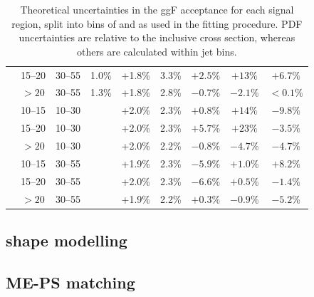\begin{table}
\begin{tabular}{ccc|cccccc}
		& 15--20 & 30--55 & 1.0\% & +1.8\% & 3.3\% & $+2.5\%$ & $+13\%$  & $+6.7\%$  \\
		&  $>20$ & 30--55 & 1.3\% & +1.8\% & 2.8\% & $-0.7\%$ & $-2.1\%$ & $<0.1\%$ \\
		\hline
		\multirow{6}{*}{\twojet}
	    & 10--15 & 10--30 &       & +2.0\% & 2.3\% & $+0.8\%$ & $+14\%$  & $-9.8\%$ \\
		& 15--20 & 10--30 &       & +2.0\% & 2.3\% & $+5.7\%$ & $+23\%$  & $-3.5\%$  \\
		&  $>20$ & 10--30 &       & +2.0\% & 2.2\% & $-0.8\%$ & $-4.7\%$ & $-4.7\%$ \\
		& 10--15 & 30--55 &       & +1.9\% & 2.3\% & $-5.9\%$ & $+1.0\%$ & $+8.2\%$ \\
		& 15--20 & 30--55 &       & +2.0\% & 2.3\% & $-6.6\%$ & $+0.5\%$ & $-1.4\%$ \\
		&  $>20$ & 30--55 &       & +1.9\% & 2.2\% & $+0.3\%$ & $-0.9\%$ & $-5.2\%$ \\
	\end{tabular}
	\caption{Theoretical uncertainties in the ggF acceptance for each signal region, 
	split into bins of \ptsubleadlep and \mll as used in the fitting procedure. PDF 
	uncertainties are relative to the inclusive cross section, whereas others are 
	calculated within jet bins.}
	\label{tab:signal:acc_unc_binned}
\end{table}





\subsection{\mt shape modelling}



\subsection{ME-PS matching}

